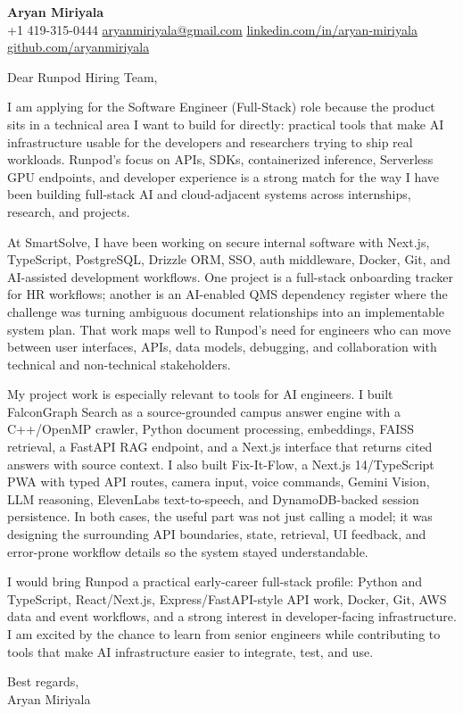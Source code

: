 \documentclass[letterpaper,11pt]{article}
\begin{document}
\begin{center}
    {\Large \textbf{Aryan Miriyala}}\\
    \vspace{2pt}
    +1 419-315-0444 \textbar{} \href{mailto:aryanmiriyala@gmail.com}{aryanmiriyala@gmail.com} \textbar{} \href{https://www.linkedin.com/in/aryan-miriyala-7788a21b6/}{linkedin.com/in/aryan-miriyala} \textbar{} \href{https://github.com/aryanmiriyala}{github.com/aryanmiriyala}
\end{center}

\vspace{10pt}

Dear Runpod Hiring Team,

I am applying for the Software Engineer (Full-Stack) role because the product sits in a technical area I want to build for directly: practical tools that make AI infrastructure usable for the developers and researchers trying to ship real workloads. Runpod's focus on APIs, SDKs, containerized inference, Serverless GPU endpoints, and developer experience is a strong match for the way I have been building full-stack AI and cloud-adjacent systems across internships, research, and projects.

At SmartSolve, I have been working on secure internal software with Next.js, TypeScript, PostgreSQL, Drizzle ORM, SSO, auth middleware, Docker, Git, and AI-assisted development workflows. One project is a full-stack onboarding tracker for HR workflows; another is an AI-enabled QMS dependency register where the challenge was turning ambiguous document relationships into an implementable system plan. That work maps well to Runpod's need for engineers who can move between user interfaces, APIs, data models, debugging, and collaboration with technical and non-technical stakeholders.

My project work is especially relevant to tools for AI engineers. I built FalconGraph Search as a source-grounded campus answer engine with a C++/OpenMP crawler, Python document processing, embeddings, FAISS retrieval, a FastAPI RAG endpoint, and a Next.js interface that returns cited answers with source context. I also built Fix-It-Flow, a Next.js 14/TypeScript PWA with typed API routes, camera input, voice commands, Gemini Vision, LLM reasoning, ElevenLabs text-to-speech, and DynamoDB-backed session persistence. In both cases, the useful part was not just calling a model; it was designing the surrounding API boundaries, state, retrieval, UI feedback, and error-prone workflow details so the system stayed understandable.

I would bring Runpod a practical early-career full-stack profile: Python and TypeScript, React/Next.js, Express/FastAPI-style API work, Docker, Git, AWS data and event workflows, and a strong interest in developer-facing infrastructure. I am excited by the chance to learn from senior engineers while contributing to tools that make AI infrastructure easier to integrate, test, and use.

\vspace{8pt}

Best regards,\\
Aryan Miriyala
\end{document}
